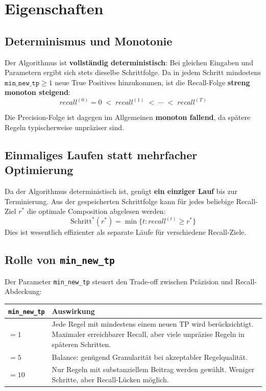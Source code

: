 \documentclass[11pt,a4paper]{article}
\begin{document}
\section{Eigenschaften}

\subsection{Determinismus und Monotonie}

Der Algorithmus ist \textbf{vollst\"andig deterministisch}: Bei gleichen Eingaben und Parametern ergibt sich stets dieselbe Schrittfolge. Da in jedem Schritt mindestens $\texttt{min\_new\_tp} \geq 1$ neue True Positives hinzukommen, ist die Recall-Folge \textbf{streng monoton steigend}:
\[
  \mathit{recall}^{(0)} = 0 \;<\; \mathit{recall}^{(1)} \;<\; \cdots \;<\; \mathit{recall}^{(T)}
\]

\noindent Die Precision-Folge ist dagegen im Allgemeinen \textbf{monoton fallend}, da sp\"atere Regeln typischerweise unpr\"aziser sind.

\subsection{Einmaliges Laufen statt mehrfacher Optimierung}

Da der Algorithmus deterministisch ist, gen\"ugt \textbf{ein einziger Lauf} bis zur Terminierung. Aus der gespeicherten Schrittfolge kann f\"ur jedes beliebige Recall-Ziel $r^*$ die optimale Composition abgelesen werden:
\[
  \text{Schritt}^*(r^*) = \min\{t : \mathit{recall}^{(t)} \geq r^*\}
\]
Dies ist wesentlich effizienter als separate L\"aufe f\"ur verschiedene Recall-Ziele.

\subsection{Rolle von \texttt{min\_new\_tp}}

Der Parameter \texttt{min\_new\_tp} steuert den Trade-off zwischen Pr\"azision und Recall-Abdeckung:

\begin{center}
\renewcommand{\arraystretch}{1.3}
\begin{tabular}{lp{10cm}}
\toprule
\texttt{min\_new\_tp} & Auswirkung \\
\midrule
$= 1$ & Jede Regel mit mindestens einem neuen TP wird ber\"ucksichtigt. Maximaler erreichbarer Recall, aber viele unpr\"azise Regeln in sp\"ateren Schritten. \\
$= 5$ & Balance: gen\"ugend Granularit\"at bei akzeptabler Regelqualit\"at. \\
$= 10$ & Nur Regeln mit substanziellem Beitrag werden gew\"ahlt. Weniger Schritte, aber Recall-L\"ucken m\"oglich. \\
\bottomrule
\end{tabular}
\end{center}
\end{document}
